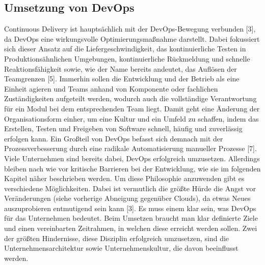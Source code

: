 \subsection{Umsetzung von DevOps}
Continuous Delivery ist hauptsächlich mit der DevOps-Bewegung verbunden [3], da DevOps eine wirkungsvolle Optimierungsmaßnahme darstellt. Dabei fokussiert sich dieser Ansatz auf die Liefergeschwindigkeit, das kontinuierliche Testen in Produktionsähnlichen Umgebungen, kontinuierliche Rückmeldung und schnelle Reaktionsfähigkeit sowie, wie der Name bereits andeutet, das Auflösen der Teamgrenzen [5]. Immerhin sollen die Entwicklung und der Betrieb als eine Einheit agieren und Teams anhand von Komponente oder fachlichen Zuständigkeiten aufgeteilt werden, wodurch auch die vollständige Verantwortung für ein Modul bei dem entsprechenden Team liegt. Damit geht eine Änderung der Organisationsform einher, um eine Kultur und ein Umfeld zu schaffen, indem das Erstellen, Testen und Freigeben von Software schnell, häufig und zuverlässig erfolgen kann. Ein Großteil von DevOps befasst sich demnach mit der Prozessverbesserung durch eine radikale Automatisierung manueller Prozesse [7].\\ Viele Unternehmen sind bereits dabei, DevOps erfolgreich umzusetzen. Allerdings bleiben nach wie vor kritische Barrieren bei der Entwicklung, wie sie im folgenden Kapitel näher beschrieben werden. Um diese Philosophie anzuwenden gibt es verschiedene Möglichkeiten. Dabei ist vermutlich die größte Hürde die Angst vor Veränderungen (siehe vorherige Abneigung gegenüber Clouds), da etwas Neues auszuprobieren entmutigend sein kann [3]. 
Es muss einem klar sein, was DevOps für das Unternehmen bedeutet. Beim Umsetzen braucht man klar definierte Ziele und einen vereinbarten Zeitrahmen, in welchen diese erreicht werden sollen. Zwei der größten Hindernisse, diese Disziplin erfolgreich umzusetzen, sind die Unternehmensarchitektur sowie Unternehmenskultur, die davon beeinflusst werden.

